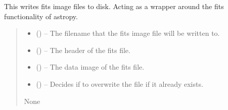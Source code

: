 \documentclass[letterpaper,11pt,english]{sphinxmanual}
\begin{document}
\begin{savenotes}\begin{fulllineitems}
\label{\detokenize{code/opihiexarata.library.fits:opihiexarata.library.fits.write_fits_image_file}}
\pysigstartsignatures
{}
\pysigstopsignatures
\sphinxAtStartPar
This writes fits image files to disk. Acting as a wrapper around the
fits functionality of astropy.
\begin{quote}\begin{description}
\begin{itemize}
\item {} 
\sphinxAtStartPar
{} () – The filename that the fits image file will be written to.

\item {} 
\sphinxAtStartPar
{} () – The header of the fits file.

\item {} 
\sphinxAtStartPar
{} () – The data image of the fits file.

\item {} 
\sphinxAtStartPar
{} (\sphinxstyleliteralemphasis{\sphinxupquote{, }}) – Decides if to overwrite the file if it already exists.

\end{itemize}

\sphinxAtStartPar
None

\end{description}\end{quote}

\end{fulllineitems}\end{savenotes}
\end{document}
